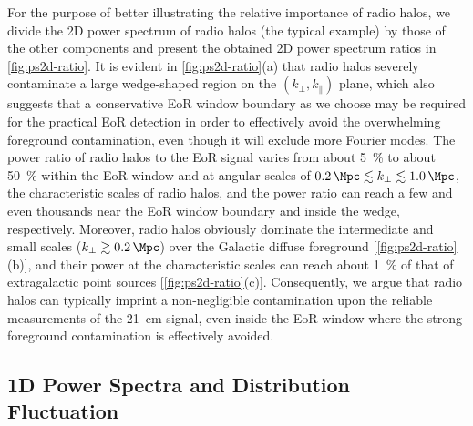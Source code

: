 \documentclass[modern]{aastex62}
\newcommand{\klos}{\text{$k_{\parallel}$}}
\newcommand{\kperp}{\text{$k_{\bot}$}}
\begin{document}
For the purpose of better illustrating the relative importance of radio
halos, we divide the 2D power spectrum of radio halos (the typical
example) by those of the other components \citep{trott2015} and present
the obtained 2D power spectrum ratios in \autoref{fig:ps2d-ratio}.
It is evident in \autoref{fig:ps2d-ratio}(a) that radio halos severely
contaminate a large wedge-shaped region on the $(\kperp, \klos)$ plane,
which also suggests that a conservative EoR window boundary as we choose
may be required for the practical EoR detection in order to effectively
avoid the overwhelming foreground contamination, even though it will
exclude more Fourier modes.
The power ratio of radio halos to the EoR signal varies from about
\SI{5}{\percent} to about \SI{50}{\percent} within the EoR window and
at angular scales of
$\SI{0.2}{\per\Mpc} \lesssim \kperp \lesssim \SI{1.0}{\per\Mpc}$,
the characteristic scales of radio halos,
and the power ratio can reach a few and even thousands near the EoR
window boundary and inside the wedge, respectively.
Moreover, radio halos obviously dominate the intermediate and small
scales ($\kperp \gtrsim \SI{0.2}{\per\Mpc}$) over the Galactic diffuse
foreground [\autoref{fig:ps2d-ratio}(b)],
and their power at the characteristic scales can reach about
\SI{1}{\percent} of that of extragalactic point sources
[\autoref{fig:ps2d-ratio}(c)].
Consequently, we argue that radio halos can typically imprint a
non-negligible contamination upon the reliable measurements of the
21~cm signal, even inside the EoR window where the strong foreground
contamination is effectively avoided.

\subsection{1D Power Spectra and Distribution Fluctuation}
\label{sec:ps1d}
\end{document}
